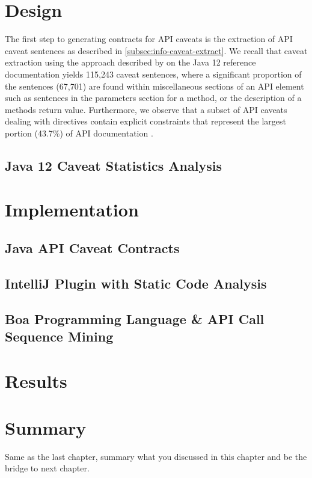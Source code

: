 \section{Design}
\label{sec:contract-design}
The first step to generating contracts for API caveats is the extraction of API caveat sentences as described in \ref{subsec:info-caveat-extract}. We recall that caveat extraction using the approach described by \cite{caveat-knowledge-graph} on the Java 12 reference documentation yields 
115,243 caveat sentences, where a significant proportion of the sentences (67,701) are found within miscellaneous sections of an API element such as sentences in the parameters section for a method, or the description of a methods return value. Furthermore, we observe that a subset of API caveats dealing with directives \cite{zhou-directive} contain explicit constraints that represent the largest portion (43.7\%) of API documentation \cite{directive-study}.

\subsection{Java 12 Caveat Statistics Analysis}
\label{subsec:contract-caveat-statistics}

\section{Implementation}
\label{sec:contract-implement}

\subsection{Java API Caveat Contracts}
\label{subsec:contract-caveat-contracts}

\subsection{IntelliJ Plugin with Static Code Analysis}
\label{subsec:contract-plugin}

\subsection{Boa Programming Language \& API Call Sequence Mining}
\label{subsec:contract-boa}

\section{Results}
\label{sec:contract-results}

\section{Summary}
\label{sec:contract-summary}
Same as the last chapter, summary what you discussed in this chapter and
be the bridge to next chapter.

